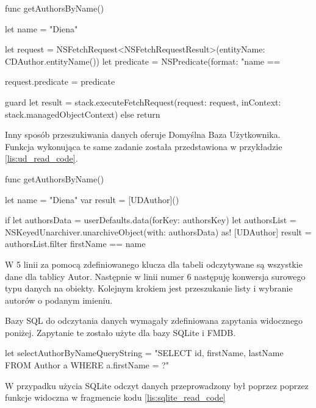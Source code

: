 \begin{code}[
		language=swift,
		caption={Przykład odczytu danych Core Data},
		label={lis:core_data_read_code},
	]
    func getAuthorsByName() {
        let name = "Diena"
        
        let request = NSFetchRequest<NSFetchRequestResult>(entityName: CDAuthor.entityName())
        let predicate = NSPredicate(format: "name == %
        
        request.predicate = predicate
        
        guard let result = stack.executeFetchRequest(request: request, inContext: stack.managedObjectContext) else { return }
    }
\end{code}

Inny sposób przeszukiwania danych oferuje Domyślna Baza Użytkownika. Funkcja wykonująca te same zadanie została przedstawiona w przykładzie \ref{lis:ud_read_code}.

\begin{code}[
		language=swift,
		caption={Przykład odczytu danych User Defaults},
		label={lis:ud_read_code},
	]
    func getAuthorsByName() {
        let name = "Diena"
        var result = [UDAuthor]()
        
        if  let authorsData = userDefaults.data(forKey: authorsKey) {
            let authorsList = NSKeyedUnarchiver.unarchiveObject(with: authorsData) as! [UDAuthor]
            result = authorsList.filter { firstName == name }
        }
    }
\end{code}


W 5 linii za pomocą zdefiniowanego klucza dla tabeli odczytywane są wszystkie dane dla tablicy Autor. Następnie w linii numer 6 następuję konwersja surowego typu danych na obiekty. Kolejnym krokiem jest przeszukanie listy i wybranie autorów o podanym imieniu. 

Bazy SQL do odczytania danych wymagały zdefiniowana zapytania widocznego poniżej. Zapytanie te zostało użyte dla bazy SQLite i FMDB.

\begin{code}[
		language=swift,
		caption={Zapytanie SQL do odczytu danych},
		label={lis:sql_read_query_code},
	]
let selectAuthorByNameQueryString = "SELECT id, firstName, lastName FROM Author a WHERE a.firstName = ?"
\end{code}

W przypadku użycia SQLite odczyt danych przeprowadzony był poprzez poprzez funkcje widoczna w fragmencie kodu \ref{lis:sqlite_read_code}

